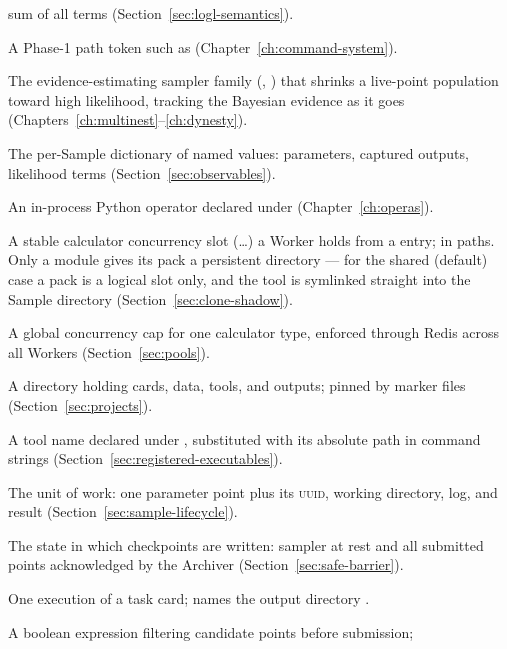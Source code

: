 \begin{description}[style=nextline, leftmargin=1.2em]
        sum of all terms (Section~\ref{sec:logl-semantics}).
  \item[marker] A Phase-1 path token such as 
        (Chapter~\ref{ch:command-system}).
  \item[nested sampling] The evidence-estimating sampler family
        (, ) that shrinks a live-point population
        toward high likelihood, tracking the Bayesian evidence as it goes
        (Chapters~\ref{ch:multinest}--\ref{ch:dynesty}).
  \item[observables] The per-Sample dictionary of named values: parameters, captured
        outputs, likelihood terms (Section~\ref{sec:observables}).
  \item[opera] An in-process Python operator declared under 
        (Chapter~\ref{ch:operas}).
  \item[pack / PackID] A stable calculator concurrency slot (\ldots{})
        a Worker holds from a  entry;  in
        paths. Only a  module gives its pack a persistent
        directory --- for the shared (default) case a pack is a logical slot only, and
        the tool is symlinked straight into the Sample directory
        (Section~\ref{sec:clone-shadow}).
  \item[pool] A global concurrency cap for one calculator type, enforced through Redis
        across all Workers (Section~\ref{sec:pools}).
  \item[project] A directory holding cards, data, tools, and outputs; pinned by marker
        files (Section~\ref{sec:projects}).
  \item[registered executable] A tool name declared under
        , substituted with its absolute path
        in command strings (Section~\ref{sec:registered-executables}).
  \item[Sample] The unit of work: one parameter point plus its \textsc{uuid}, working
        directory, log, and result (Section~\ref{sec:sample-lifecycle}).
  \item[safe barrier] The state in which checkpoints are written: sampler at rest and
        all submitted points acknowledged by the Archiver
        (Section~\ref{sec:safe-barrier}).
  \item[scan] One execution of a task card; names the output directory
        .
  \item[selection] A boolean expression filtering candidate points before submission;

\end{description}
